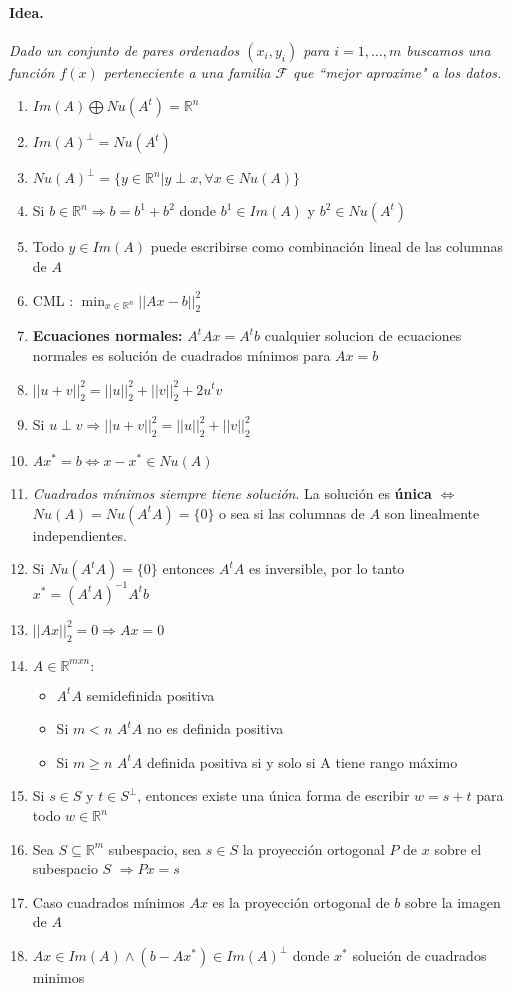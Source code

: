 \paragraph{Idea.} \textit{Dado un conjunto de pares ordenados $(x_i, y_i)$ para $i = 1, \dots, m$ buscamos una función $f(x)$ perteneciente a una familia $\mathcal{F}$ que ``mejor aproxime" a los datos.}

\begin{enumerate}
    \item $Im(A) \bigoplus Nu(A^t) = \mathbb{R}^n$
    \item $Im(A)^{\perp} = Nu(A^t)$
    \item $Nu(A)^{\perp} = \{y \in \mathbb{R}^n | y\perp x,  \forall x \in Nu(A)\}$
    \item Si $b \in \mathbb{R}^n \Rightarrow b = b^1 + b^2$ donde $b^1 \in Im(A)$ y $b^2 \in Nu(A^t)$
    \item Todo $y\in Im(A)$ puede escribirse como combinación lineal de las columnas de $A$
    \item CML : $\min_{x\in\mathbb{R}^n} ||Ax-b||_2^2$ 
    \item \textbf{Ecuaciones normales:} $A^tAx=A^tb$ cualquier solucion de ecuaciones normales es solución de cuadrados mínimos para $Ax=b$
    \item $||u+v||_2^2 = ||u||_2^2+||v||_2^2 + 2u^tv$
    \item Si $u\perp v \Rightarrow ||u+v||_2^2 = ||u||_2^2+||v||_2^2$ 
    \item $Ax^*=b \iff x-x^*\in Nu(A)$
    \item \textit{Cuadrados mínimos siempre tiene solución}. La solución es \textbf{única} $\iff$ $Nu(A) = Nu(A^tA)=\{0\}$ o sea si las columnas de $A$ son linealmente independientes. 
    \item Si $Nu(A^tA) = \{0\}$ entonces $A^tA$ es inversible, por lo tanto $x^* = (A^tA)^{-1}A^tb$
    \item $||Ax||_2^2= 0 \Rightarrow Ax=0$
     \item $A\in\mathbb{R}^{mxn}:$\begin{itemize}
         \item $A^tA$ semidefinida positiva
         \item Si $m<n$ $A^tA$ no es definida positiva
         \item Si $m\geq n$ $A^tA$ definida positiva si y solo si A tiene rango máximo
     \end{itemize}
     \item Si $s\in S$ y $t \in S^{\perp}$, entonces existe una única forma de escribir $w=s+t$ para todo $w\in\mathbb{R}^n$
     \item Sea $S\subseteq \mathbb{R}^m$ subespacio, sea $s \in S$ la proyección ortogonal $P$ de $x$ sobre el subespacio $S$ $\Rightarrow Px=s$
     \item Caso cuadrados mínimos $Ax$ es la proyección ortogonal de $b$ sobre la imagen de $A$
     \item $Ax \in Im(A) \land (b-Ax^*) \in Im(A)^{\perp}$ donde $x^*$ solución de cuadrados minimos
\end{enumerate}

